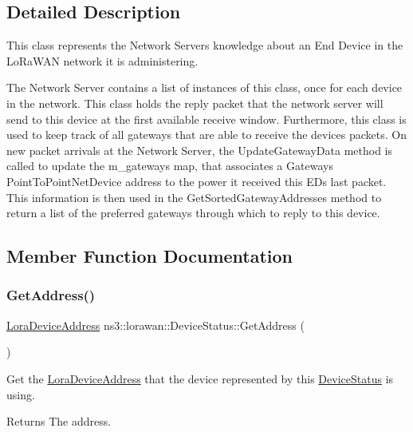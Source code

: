 \subsection{Detailed Description}
This class represents the Network Server\textquotesingle{}s knowledge about an End Device in the Lo\+Ra\+W\+AN network it is administering.

The Network Server contains a list of instances of this class, once for each device in the network. This class holds the reply packet that the network server will send to this device at the first available receive window. Furthermore, this class is used to keep track of all gateways that are able to receive the device\textquotesingle{}s packets. On new packet arrivals at the Network Server, the Update\+Gateway\+Data method is called to update the m\+\_\+gateways map, that associates a Gateway\textquotesingle{}s Point\+To\+Point\+Net\+Device address to the power it received this ED\textquotesingle{}s last packet. This information is then used in the Get\+Sorted\+Gateway\+Addresses method to return a list of the preferred gateways through which to reply to this device. 

\subsection{Member Function Documentation}
\mbox{\label{classns3_1_1lorawan_1_1DeviceStatus_ad1ff55d93bc1347ac860a921d590053e}} 
\subsubsection{\texorpdfstring{Get\+Address()}{GetAddress()}}
{\footnotesize\ttfamily \hyperlink{classns3_1_1lorawan_1_1LoraDeviceAddress}{Lora\+Device\+Address} ns3\+::lorawan\+::\+Device\+Status\+::\+Get\+Address (\begin{DoxyParamCaption}{ }\end{DoxyParamCaption})}

Get the \hyperlink{classns3_1_1lorawan_1_1LoraDeviceAddress}{Lora\+Device\+Address} that the device represented by this \hyperlink{classns3_1_1lorawan_1_1DeviceStatus}{Device\+Status} is using.

\begin{DoxyReturn}{Returns}
The address. 
\end{DoxyReturn}
\mbox{\label{classns3_1_1lorawan_1_1DeviceStatus_a339650bdf62a9c13d458f4276222e740}} 

